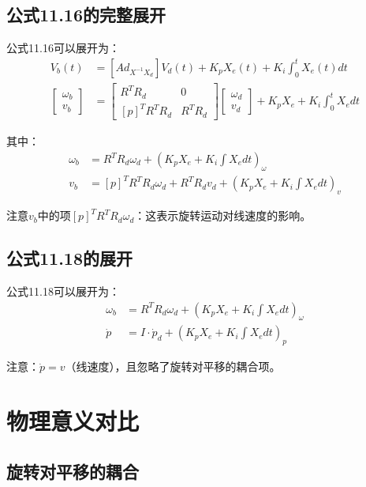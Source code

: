 \documentclass[12pt,a4paper]{article}
\begin{document}
\subsection{公式11.16的完整展开}

公式11.16可以展开为：
\begin{align}
V_b(t) &= [Ad_{X^{-1}X_d}] V_d(t) + K_p X_e(t) + K_i \int_0^t X_e(t) dt \\
\begin{bmatrix}
\omega_b \\
v_b
\end{bmatrix} &= \begin{bmatrix}
R^T R_d & 0 \\
[p]^T R^T R_d & R^T R_d
\end{bmatrix}
\begin{bmatrix}
\omega_d \\
v_d
\end{bmatrix}
+ K_p X_e + K_i \int_0^t X_e dt
\end{align}

其中：
\begin{align}
\omega_b &= R^T R_d \omega_d + (K_p X_e + K_i \int X_e dt)_{\omega} \\
v_b &= [p]^T R^T R_d \omega_d + R^T R_d v_d + (K_p X_e + K_i \int X_e dt)_{v}
\end{align}

注意$v_b$中的项$[p]^T R^T R_d \omega_d$：这表示旋转运动对线速度的影响。

\subsection{公式11.18的展开}

公式11.18可以展开为：
\begin{align}
\omega_b &= R^T R_d \omega_d + (K_p X_e + K_i \int X_e dt)_{\omega} \\
\dot{p} &= I \cdot \dot{p}_d + (K_p X_e + K_i \int X_e dt)_{p}
\end{align}

注意：$\dot{p} = v$（线速度），且忽略了旋转对平移的耦合项。

\section{物理意义对比}

\subsection{旋转对平移的耦合}
\end{document}
